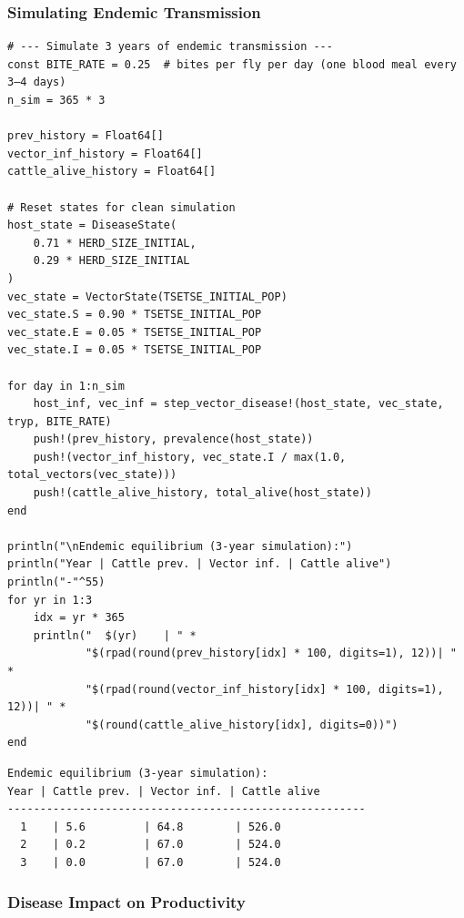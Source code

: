 \subsubsection{Simulating Endemic Transmission}



\label{16082011759847008825}{}



\begin{verbatim}
# --- Simulate 3 years of endemic transmission ---
const BITE_RATE = 0.25  # bites per fly per day (one blood meal every 3–4 days)
n_sim = 365 * 3

prev_history = Float64[]
vector_inf_history = Float64[]
cattle_alive_history = Float64[]

# Reset states for clean simulation
host_state = DiseaseState(
    0.71 * HERD_SIZE_INITIAL,
    0.29 * HERD_SIZE_INITIAL
)
vec_state = VectorState(TSETSE_INITIAL_POP)
vec_state.S = 0.90 * TSETSE_INITIAL_POP
vec_state.E = 0.05 * TSETSE_INITIAL_POP
vec_state.I = 0.05 * TSETSE_INITIAL_POP

for day in 1:n_sim
    host_inf, vec_inf = step_vector_disease!(host_state, vec_state, tryp, BITE_RATE)
    push!(prev_history, prevalence(host_state))
    push!(vector_inf_history, vec_state.I / max(1.0, total_vectors(vec_state)))
    push!(cattle_alive_history, total_alive(host_state))
end

println("\nEndemic equilibrium (3-year simulation):")
println("Year | Cattle prev. | Vector inf. | Cattle alive")
println("-"^55)
for yr in 1:3
    idx = yr * 365
    println("  $(yr)    | " *
            "$(rpad(round(prev_history[idx] * 100, digits=1), 12))| " *
            "$(rpad(round(vector_inf_history[idx] * 100, digits=1), 12))| " *
            "$(round(cattle_alive_history[idx], digits=0))")
end
\end{verbatim}




\begin{verbatim}
Endemic equilibrium (3-year simulation):
Year | Cattle prev. | Vector inf. | Cattle alive
-------------------------------------------------------
  1    | 5.6         | 64.8        | 526.0
  2    | 0.2         | 67.0        | 524.0
  3    | 0.0         | 67.0        | 524.0
\end{verbatim}



\subsubsection{Disease Impact on Productivity}



